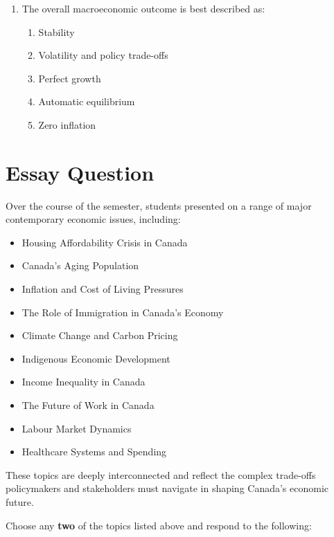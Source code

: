 \documentclass[12pt]{article}
\begin{document}
\begin{enumerate}[label=\textbf{\arabic*.}]
\item The overall macroeconomic outcome is best described as:
\begin{enumerate}[label=\Alph*.]
\item Stability
\item Volatility and policy trade-offs
\item Perfect growth
\item Automatic equilibrium
\item Zero inflation
\end{enumerate}

\end{enumerate}


\newpage

\section*{Essay Question}

Over the course of the semester, students presented on a range of major contemporary economic issues, including:

\begin{itemize}
\item Housing Affordability Crisis in Canada
\item Canada’s Aging Population
\item Inflation and Cost of Living Pressures
\item The Role of Immigration in Canada’s Economy
\item Climate Change and Carbon Pricing
\item Indigenous Economic Development
\item Income Inequality in Canada
\item The Future of Work in Canada
\item Labour Market Dynamics
\item Healthcare Systems and Spending

\end{itemize}

These topics are deeply interconnected and reflect the complex trade-offs policymakers and stakeholders must navigate in shaping Canada’s economic future.

\bigskip

Choose any \textbf{two} of the topics listed above and respond to the following:
\end{document}
